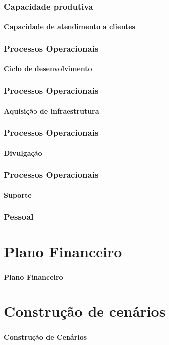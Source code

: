 \documentclass{beamer}
\begin{document}
\begin{frame}
  \frametitle{Capacidade produtiva}
  \framesubtitle{Capacidade de atendimento a clientes}

  
\end{frame}

\begin{frame}
  \frametitle{Processos Operacionais}
  \framesubtitle{Ciclo de desenvolvimento}

\end{frame}

\begin{frame}
  \frametitle{Processos Operacionais}
  \framesubtitle{Aquisição de infraestrutura}

\end{frame}

\begin{frame}
  \frametitle{Processos Operacionais}
  \framesubtitle{Divulgação}

\end{frame}

\begin{frame}
  \frametitle{Processos Operacionais}
  \framesubtitle{Suporte}

\end{frame}

\begin{frame}
  \frametitle{Pessoal}

\end{frame}

\section{Plano Financeiro}
\begin{frame}
  \frametitle{}
  \framesubtitle{}

  \begin{center}
    {\huge\textbf{Plano Financeiro}}
  \end{center}
\end{frame}

\section{Construção de cenários}
\begin{frame}
  \frametitle{}
  \framesubtitle{}

  \begin{center}
    {\huge\textbf{Construção de Cenários}}
  \end{center}
\end{frame}
\end{document}
